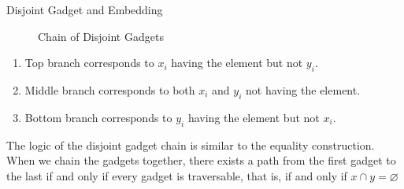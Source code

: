 \begin{block}{Disjoint Gadget and Embedding}

\begin{figure}
\centering
{}
\caption{Chain of Disjoint Gadgets}
\label{fig:equality-gadget-chain}
\end{figure}

\begin{enumerate}
\item Top branch corresponds to $x_i$ having the element but not $y_i$.
\item Middle branch corresponds to both $x_i$ and $y_i$ not having the element.
\item Bottom branch corresponds to $y_i$ having the element but not $x_i$.
\end{enumerate}

The logic of the disjoint gadget chain is similar to the equality construction. When we chain the gadgets together, there exists a path from the first gadget to the last
if and only if every gadget is traversable, that is, if and only if $x \cap y = \varnothing$


\end{block}

 